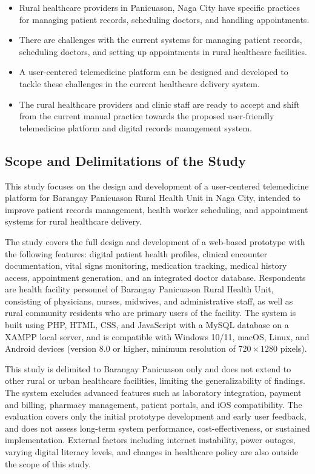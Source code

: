 \documentclass{research}
\begin{document}
\begin{itemize}
  \item Rural healthcare providers in Panicuason, Naga City have specific practices for managing
        patient records, scheduling doctors, and handling appointments.
  \item There are challenges with the current systems for managing patient records, scheduling
        doctors, and setting up appointments in rural healthcare facilities.
  \item A user-centered telemedicine platform can be designed and developed to tackle these
        challenges in the current healthcare delivery system.
  \item The rural healthcare providers and clinic staff are ready to accept and shift from the
        current manual practice towards the proposed user-friendly telemedicine platform and
        digital records management system.
\end{itemize}

\subsection*{Scope and Delimitations of the Study}

This study focuses on the design and development of a user-centered telemedicine platform for
Barangay Panicuason Rural Health Unit in Naga City, intended to improve patient records
management, health worker scheduling, and appointment systems for rural healthcare delivery.

The study covers the full design and development of a web-based prototype with the following
features: digital patient health profiles, clinical encounter documentation, vital signs
monitoring, medication tracking, medical history access, appointment generation, and an integrated
doctor database. Respondents are health facility personnel of Barangay Panicuason Rural Health
Unit, consisting of physicians, nurses, midwives, and administrative staff, as well as rural
community residents who are primary users of the facility. The system is built using PHP, HTML,
CSS, and JavaScript with a MySQL database on a XAMPP local server, and is compatible with Windows
10/11, macOS, Linux, and Android devices (version 8.0 or higher, minimum resolution of
$720\times1280$ pixels).

This study is delimited to Barangay Panicuason only and does not extend to other rural or urban
healthcare facilities, limiting the generalizability of findings. The system excludes advanced
features such as laboratory integration, payment and billing, pharmacy management, patient
portals, and iOS compatibility. The evaluation covers only the initial prototype development and
early user feedback, and does not assess long-term system performance, cost-effectiveness, or
sustained implementation. External factors including internet instability, power outages, varying
digital literacy levels, and changes in healthcare policy are also outside the scope of this
study.
\end{document}

